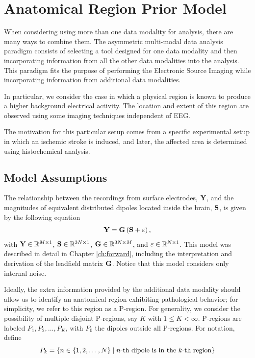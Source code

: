 \chapter{Anatomical Region Prior Model}
\label{ch:new_model}
%


When considering using more than one data modality for analysis, there are many ways to combine them. 
%
The asymmetric multi-modal data analysis paradigm consists of selecting a tool designed for one data modality and then incorporating information from all the other data modalities into the analysis.
%
This paradigm fits the purpose of performing the Electronic Source Imaging while incorporating information from additional data modalities.


In particular, we consider the case in which a physical region is known to produce a higher background electrical activity.
%
The location and extent of this region are observed using some imaging techniques independent of EEG.

The motivation for this particular setup comes from a specific experimental setup in which an ischemic stroke is induced, and later, the affected area is determined using histochemical analysis.

\section{Model Assumptions}

The relationship between the recordings from surface electrodes, $\mathbf{Y}$, and the magnitudes of equivalent distributed dipoles located inside the brain, $\mathbf{S}$, is given by the following equation
\begin{equation}
\mathbf{Y} = \mathbf{G} \left( \mathbf{S} + \varepsilon \right),
\label{eq:3.1}
\end{equation}
with $\mathbf{Y} \in \mathbb{R}^{M \times 1}$, $\mathbf{S} \in \mathbb{R}^{3N \times 1}$, $\mathbf{G} \in \mathbb{R}^{3N\times M}$, and $\varepsilon\in \mathbb{R}^{N\times 1}$.
%
This model was described in detail in Chapter \ref{ch:forward}, including the interpretation and derivation of the leadfield matrix $\mathbf{G}$.
%
Notice that this model considers only internal noise.

Ideally, the extra information provided by the additional data modality should allow us to identify an anatomical region exhibiting pathological behavior; for simplicity, we refer to this region as a P-region. 
%
For generality, we consider the possibility of multiple disjoint P-regions, say $K$ with $1\leq K < \infty$.
%
P-regions are labeled $P_1, P_2, \dots, P_K$, with $P_0$ the dipoles outside all P-regions.
%
For notation, define 
\begin{equation}
    P_k = \left\{  n\in \left\{ 1, 2, \dots, N \right\} \;\middle|\; n\text{-th dipole is in the } k\text{-th region}  \right\}
\end{equation}

